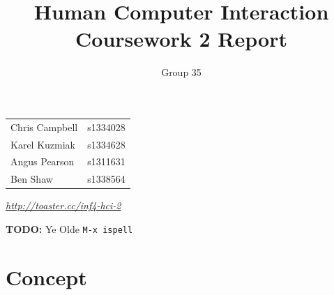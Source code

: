 \documentclass[a4paper, notoc]{tufte-handout}
\title{Human Computer Interaction\\ Coursework 2 Report}
\author{Group 35}
\begin{document}
\maketitle %
\vspace{1em}
\noindent
\begin{tabular}{l r}
  Chris Campbell & s1334028\\
  Karel Kuzmiak  & s1334628\\
  Angus Pearson  & s1311631\\
  Ben Shaw       & s1338564\\
\end{tabular}


\vspace{1em}
\noindent
\href{http://toaster.cc/inf4-hci-2}{\textit{http://toaster.cc/inf4-hci-2}}


\vspace{1em}\noindent \textbf{TODO:} Ye Olde \verb|M-x ispell|

\section{Concept}\label{sec:concept}
\end{document}
